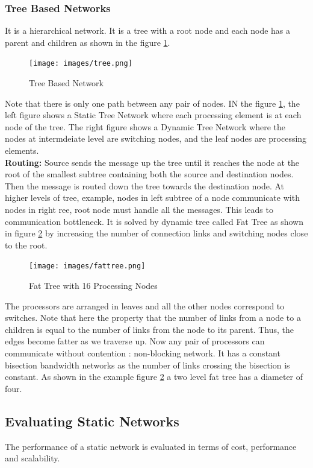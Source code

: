 \documentclass[12pt]{article}
\begin{document}
\subsubsection{Tree Based Networks}
It is a hierarchical network. It is a tree with a root node and each node has a parent and children
as shown in the figure \ref{fig:tree}.
\begin{figure}[H]
    \centering
    \texttt{[image: images/tree.png]}
    \caption{Tree Based Network}
    \label{fig:tree}
\end{figure}
Note that there is only one path between any pair of nodes.
IN the figure \ref{fig:tree}, the left figure shows a Static Tree Network where each processing element is at 
each node of the tree. The right figure shows a Dynamic Tree Network where the nodes at intermdeiate level
are switching nodes, and the leaf nodes are processing elements.\\
\textbf{Routing: }Source sends the message up the tree until it reaches the node at the root of the smallest subtree containing both the 
source and destination nodes. Then the message is routed down the tree towards the destination node.
At higher levels of tree, example, nodes in left subtree of a node communicate with nodes in right ree, root node must handle all the messages. This leads to
communication bottleneck. It is solved by dynamic tree called Fat Tree as shown in figure \ref{fig:fattree} by increasing the number of connection links and switching nodes close to the root.
\begin{figure}[H]
    \centering
    \texttt{[image: images/fattree.png]}
    \caption{Fat Tree with 16 Processing Nodes}
    \label{fig:fattree}
\end{figure}
The processors are arranged in leaves and all the other nodes correspond to switches. Note that here the property that 
the number of links from a node to a children is equal to the number of links from the node to its parent. Thus, the edges become fatter as we traverse up.
Now any pair of processors can communicate without contention : non-blocking network. It has a constant bisection bandwidth networks as 
the number of links crossing the bisection is constant. As shown in the example figure \ref{fig:fattree} a two level fat tree has a diameter of four.
\subsection{Evaluating Static Networks}
The performance of a static network is evaluated in terms of cost, performance and scalability.
\end{document}
